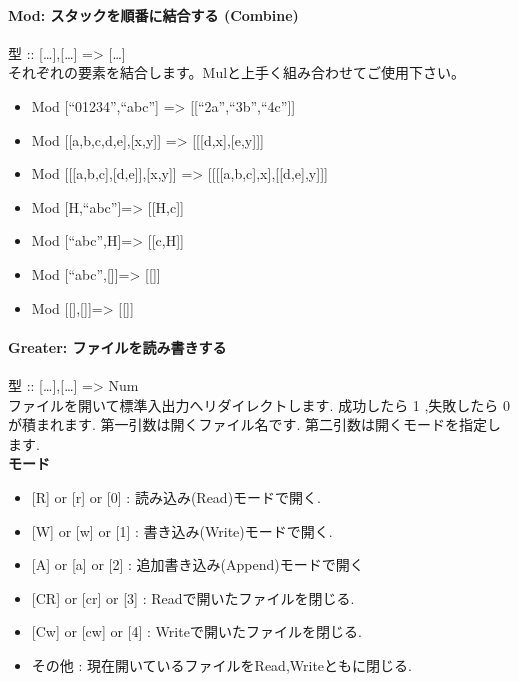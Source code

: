 \paragraph{Mod: スタックを順番に結合する (Combine)}

型 :: {[}\ldots{}{]},{[}\ldots{}{]} =\textgreater{}
{[}\ldots{}{]}\\それぞれの要素を結合します。Mulと上手く組み合わせてご使用下さい。

\begin{itemize}
\item
  Mod {[}``01234'',``abc''{]} =\textgreater{}
  {[}{[}``2a'',``3b'',``4c''{]}{]}
\item
  Mod {[}{[}a,b,c,d,e{]},{[}x,y{]}{]} =\textgreater{}
  {[}{[}{[}d,x{]},{[}e,y{]}{]}{]}
\item
  Mod {[}{[}{[}a,b,c{]},{[}d,e{]}{]},{[}x,y{]}{]} =\textgreater{}
  {[}{[}{[}{[}a,b,c{]},x{]},{[}{[}d,e{]},y{]}{]}{]}
\item
  Mod {[}H,``abc''{]}=\textgreater{} {[}{[}H,c{]}{]}
\item
  Mod {[}``abc'',H{]}=\textgreater{} {[}{[}c,H{]}{]}
\item
  Mod {[}``abc'',{[}{]}{]}=\textgreater{} {[}{[}{]}{]}
\item
  Mod {[}{[}{]},{[}{]}{]}=\textgreater{} {[}{[}{]}{]}
\end{itemize}

\paragraph{Greater: ファイルを読み書きする}

型 :: {[}\ldots{}{]},{[}\ldots{}{]} =\textgreater{}
Num\\ファイルを開いて標準入出力へリダイレクトします. 成功したら 1
,失敗したら 0 が積まれます. 第一引数は開くファイル名です.
第二引数は開くモードを指定します.\\\textbf{モード}

\begin{itemize}
\item
  {[}R{]} or {[}r{]} or {[}0{]} : 読み込み(Read)モードで開く.
\item
  {[}W{]} or {[}w{]} or {[}1{]} : 書き込み(Write)モードで開く.
\item
  {[}A{]} or {[}a{]} or {[}2{]} : 追加書き込み(Append)モードで開く
\item
  {[}CR{]} or {[}cr{]} or {[}3{]} : Readで開いたファイルを閉じる.
\item
  {[}Cw{]} or {[}cw{]} or {[}4{]} : Writeで開いたファイルを閉じる.
\item
  その他 : 現在開いているファイルをRead,Writeともに閉じる.
\end{itemize}

